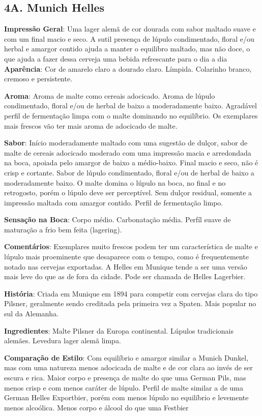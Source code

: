 \subsection*{4A. Munich Helles}


\textbf{Impressão Geral}: Uma lager alemã de cor dourada com sabor maltado suave e com um final macio e seco. A sutil presença de lúpulo condimentado, floral e/ou herbal e amargor contido ajuda a manter o equilibro maltado, mas não doce, o que ajuda a fazer dessa cerveja uma bebida refrescante para o dia a dia
\textbf{Aparência}: Cor de amarelo claro a dourado claro. Límpida. Colarinho branco, cremoso e persistente.

\textbf{Aroma}: Aroma de malte como cereais adocicado. Aroma de lúpulo condimentado, floral e/ou de herbal de baixo a moderadamente baixo. Agradável perfil de fermentação limpa com o malte dominando no equilíbrio. Os exemplares mais frescos vão ter mais aroma de adocicado de malte.

\textbf{Sabor}: Início moderadamente maltado com uma sugestão de dulçor, sabor de malte de cereais adocicado moderado com uma impressão macia e arredondada na boca, apoiada pelo amargor de baixo a médio-baixo. Final macio e seco, não é crisp e cortante. Sabor de lúpulo condimentado, floral e/ou de herbal de baixo a moderadamente baixo. O malte domina o lúpulo na boca, no final e no retrogosto, porém o lúpulo deve ser perceptível. Sem dulçor residual, somente a impressão maltada com amargor contido. Perfil de fermentação limpo.

\textbf{Sensação na Boca}: Corpo médio. Carbonatação média. Perfíl suave de maturação a frio bem feita (lagering).

\textbf{Comentários}: Exemplares muito frescos podem ter um característica de malte e lúpulo mais proeminente que desaparece com o tempo, como é frequentemente notado nas cervejas exportadas. A Helles em Munique tende a ser uma versão mais leve do que as de fora da cidade. Pode ser chamada de Helles Lagerbier.

\textbf{História}: Criada em Munique em 1894 para competir com cervejas clara do tipo Pilsner, geralmente sendo creditada pela primeira vez a Spaten. Mais popular no sul da Alemanha.

\textbf{Ingredientes}: Malte Pilsner da Europa continental. Lúpulos tradicionais alemães. Levedura lager alemã limpa.

\textbf{Comparação de Estilo}: Com equilíbrio e amargor similar a Munich Dunkel, mas com uma natureza menos adocicada de malte e de cor clara ao invés de ser escura e rica. Maior corpo e presença de malte do que uma German Pils, mas menos crisp e com menos caráter de lúpulo. Perfil de malte similar a de uma German Helles Exportbier, porém com menos lúpulo no equilíbrio e levemente menos alcoólica. Menos corpo e álcool do que uma Festbier

